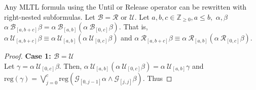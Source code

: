 \documentclass[runningheads]{llncs}
\begin{document}
\begin{theorem}  Any MLTL formula using the Until or Release operator can be rewritten with right-nested subformulas. Let $\mathcal{B} = \mathcal{R} \text{ or } \mathcal{U}$. Let $a,b,c \in \mathbb{Z}_{\geq 0} , a \leq b,$  $ \alpha,   \beta$  $ \alpha \ \mathcal{B}_{[a,b+c]} \beta = \alpha \ \mathcal{B}_{[a,b]}(\alpha \ \mathcal{B}_{[0,c]} \beta)$. That is, $ \alpha \ \mathcal{U}_{[a,b+c]} \beta \equiv \alpha \ \mathcal{U}_{[a,b]}(\alpha \ \mathcal{U}_{[0,c]} \beta)$ and $ \alpha \ \mathcal{R}_{[a,b+c]} \beta \equiv \alpha \ \mathcal{R}_{[a,b]}(\alpha \ \mathcal{R}_{[0,c]} \beta)$.
\end{theorem}
\begin{proof}

\textbf{Case 1: $\mathbf{\mathcal{B} = \mathcal{U}}$}\\

\noindent Let $\gamma = \alpha \ \mathcal{U}_{[0,c]} \beta$. Then, $\alpha \ \mathcal{U}_{[a,b]}(\alpha \ \mathcal{U}_{[0,c]} \beta) = \alpha \ \mathcal{U}_{[a,b]}\gamma$ and $\text{reg}\left(\gamma\right) = \bigvee_{j=0}^{c} \text{reg}\left(\mathcal{G}_{[0,j-1]}\alpha \land \mathcal{G}_{[j, j]}\beta\right).$ Thus


\end{proof}
\end{document}
